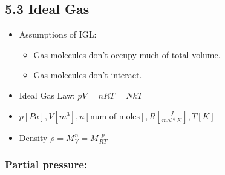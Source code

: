 \subsection{5.3 Ideal Gas}
    \begin{itemize}
        \item Assumptions of IGL:
        \begin{itemize}
            \item Gas molecules don't occupy much of total volume.
            \item Gas molecules don't interact.
        \end{itemize}
        \item Ideal Gas Law: $pV = nRT=N kT$
        \item $p\left[Pa\right], V\left[m^3\right], n\left[\text{num of moles}\right], R\left[\frac{J}{mol*K}\right], T\left[K\right]$
        \item Density $\rho = M\frac{n}{V}=M\frac{p}{RT}$
    \end{itemize}
    \subsubsection{Partial pressure:}
